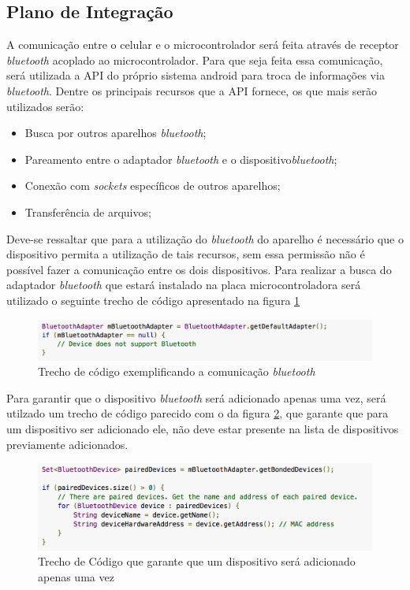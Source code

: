 	\subsection{Plano de Integração}
	  A comunicação entre o celular e o microcontrolador será feita através de receptor \textit{bluetooth} acoplado ao microcontrolador. Para que seja feita essa comunicação, será utilizada a API do próprio sistema android para troca de informações via \textit{bluetooth}. Dentre os principais recursos que a API fornece, os que mais serão utilizados serão:
	  \begin{itemize}
	  	\item Busca por outros aparelhos \textit{bluetooth};
	  	\item Pareamento entre o adaptador \textit{bluetooth} e o dispositivo\textit{bluetooth};
	  	\item Conexão com \textit{sockets} específicos de outros aparelhos;
	  	\item Transferência de arquivos;
	  \end{itemize}
	  
	  Deve-se ressaltar que para a utilização do \textit{bluetooth} do aparelho é necessário que o dispositivo permita a utilização de tais recursos, sem essa permissão não é possível fazer a comunicação entre os dois dispositivos.  
  	Para realizar a busca do adaptador \textit{bluetooth} que estará instalado na placa microcontroladora será utilizado o seguinte trecho de código apresentado na figura \ref{img:bluetooth_enabled}
  	
  	\graphicspath{{figuras/}}
  	\begin{figure}[!htb]
  	\centering
  	\includegraphics[scale=0.60]{bluetooth_enabled}
  	\caption{Trecho de código exemplificando a comunicação \textit{bluetooth}}
  	\label{img:bluetooth_enabled}
  	\end{figure}
  	
  	Para garantir que o dispositivo \textit{bluetooth} será adicionado apenas uma vez, será utilzado um trecho de código parecido com o da figura \ref{img:bluetooth_devices}, que garante que para um dispositivo ser adicionado ele, não deve estar presente na lista de dispositivos previamente adicionados.
  	
  	\graphicspath{{figuras/}}
  	\begin{figure}[!htb]
  	\centering
  	\includegraphics[scale=0.60]{bluetooth_paired_devices}
  	\caption{Trecho de Código que garante que um dispositivo será adicionado apenas uma vez}
  	\label{img:bluetooth_devices}
  	\end{figure}
  	
